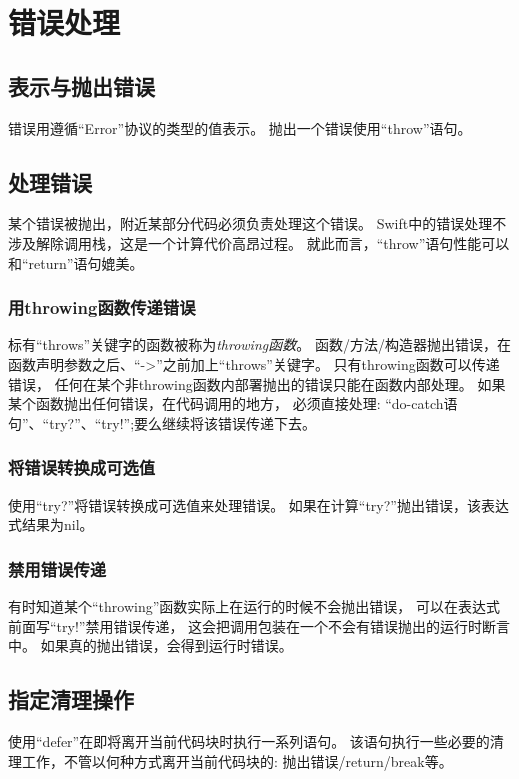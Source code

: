\documentclass{../main.tex}{subfiles}
\begin{document}
\section{错误处理}



\subsection{表示与抛出错误}
错误用遵循``Error''协议的类型的值表示。
抛出一个错误使用``throw''语句。

\subsection{处理错误}
某个错误被抛出，附近某部分代码必须负责处理这个错误。
Swift中的错误处理不涉及解除调用栈，这是一个计算代价高昂过程。
就此而言，``throw''语句性能可以和``return''语句媲美。

\subsubsection{用throwing函数传递错误}
标有``throws''关键字的函数被称为\emph{throwing函数}。
函数/方法/构造器抛出错误，在函数声明参数之后、``->''之前加上``throws''关键字。
只有throwing函数可以传递错误，
任何在某个非throwing函数内部署抛出的错误只能在函数内部处理。
如果某个函数抛出任何错误，在代码调用的地方，
必须直接处理: ``do-catch语句''、``try?''、``try!'';要么继续将该错误传递下去。

\subsubsection{将错误转换成可选值}
使用``try?''将错误转换成可选值来处理错误。
如果在计算``try?''抛出错误，该表达式结果为nil。

\subsubsection{禁用错误传递}
有时知道某个``throwing''函数实际上在运行的时候不会抛出错误，
可以在表达式前面写``try!''禁用错误传递，
这会把调用包装在一个不会有错误抛出的运行时断言中。
如果真的抛出错误，会得到运行时错误。

\subsection{指定清理操作}
使用``defer''在即将离开当前代码块时执行一系列语句。
该语句执行一些必要的清理工作，不管以何种方式离开当前代码块的:
抛出错误/return/break等。
\end{document}
